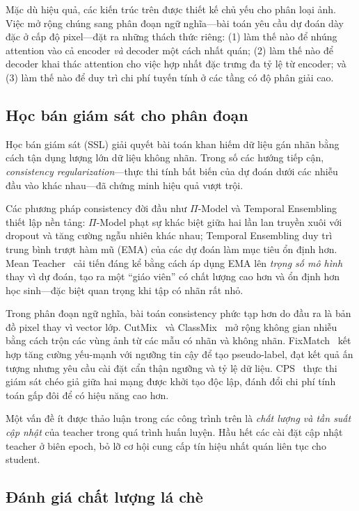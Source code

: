 \documentclass[conference]{IEEEtran}
\begin{document}
Mặc dù hiệu quả, các kiến trúc trên được thiết kế chủ yếu cho phân loại ảnh. Việc mở rộng chúng sang phân đoạn ngữ nghĩa---bài toán yêu cầu dự đoán dày đặc ở cấp độ pixel---đặt ra những thách thức riêng: (1) làm thế nào để nhúng attention vào cả encoder \textit{và} decoder một cách nhất quán; (2) làm thế nào để decoder khai thác attention cho việc hợp nhất đặc trưng đa tỷ lệ từ encoder; và (3) làm thế nào để duy trì chi phí tuyến tính ở các tầng có độ phân giải cao.

\subsection{Học bán giám sát cho phân đoạn}

Học bán giám sát (SSL) giải quyết bài toán khan hiếm dữ liệu gán nhãn bằng cách tận dụng lượng lớn dữ liệu không nhãn. Trong số các hướng tiếp cận, \textit{consistency regularization}---thực thi tính bất biến của dự đoán dưới các nhiễu đầu vào khác nhau---đã chứng minh hiệu quả vượt trội.

Các phương pháp consistency đời đầu như $\Pi$-Model và Temporal Ensembling~\cite{b11} thiết lập nền tảng: $\Pi$-Model phạt sự khác biệt giữa hai lần lan truyền xuôi với dropout và tăng cường ngẫu nhiên khác nhau; Temporal Ensembling duy trì trung bình trượt hàm mũ (EMA) của các dự đoán làm mục tiêu ổn định hơn. Mean Teacher~\cite{b4} cải tiến đáng kể bằng cách áp dụng EMA lên \textit{trọng số mô hình} thay vì dự đoán, tạo ra một ``giáo viên'' có chất lượng cao hơn và ổn định hơn học sinh---đặc biệt quan trọng khi tập có nhãn rất nhỏ.

Trong phân đoạn ngữ nghĩa, bài toán consistency phức tạp hơn do đầu ra là bản đồ pixel thay vì vector lớp. CutMix~\cite{b12} và ClassMix~\cite{b14} mở rộng không gian nhiễu bằng cách trộn các vùng ảnh từ các mẫu có nhãn và không nhãn. FixMatch~\cite{b13} kết hợp tăng cường yếu-mạnh với ngưỡng tin cậy để tạo pseudo-label, đạt kết quả ấn tượng nhưng yêu cầu cài đặt cẩn thận ngưỡng và tỷ lệ dữ liệu. CPS~\cite{b15} thực thi giám sát chéo giả giữa hai mạng được khởi tạo độc lập, đánh đổi chi phí tính toán gấp đôi để có hiệu năng cao hơn.

Một vấn đề ít được thảo luận trong các công trình trên là \textit{chất lượng và tần suất cập nhật} của teacher trong quá trình huấn luyện. Hầu hết các cài đặt cập nhật teacher ở biên epoch, bỏ lỡ cơ hội cung cấp tín hiệu nhất quán liên tục cho student.

\subsection{Đánh giá chất lượng lá chè}
\end{document}
